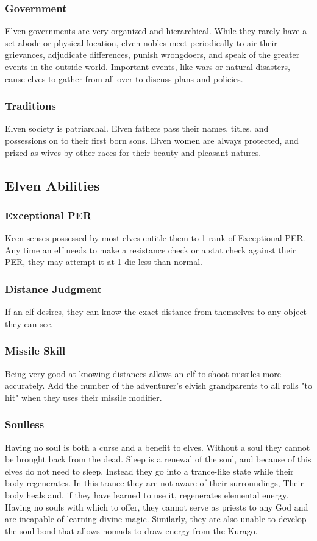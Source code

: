 \begin{multicols*}{2}
\subsubsection{Government}
Elven governments are very organized and hierarchical. While they rarely have a set abode or physical location, elven nobles meet periodically to air their grievances, adjudicate differences, punish wrongdoers, and speak of the greater events in the outside world. Important events, like wars or natural disasters, cause elves to gather from all over to discuss plans and policies.
\subsubsection{Traditions}
Elven society is patriarchal. Elven fathers pass their names, titles, and possessions on to their first born sons. Elven women are always protected, and prized as wives by other races for their beauty and pleasant natures.
\subsection{Elven Abilities}
\subsubsection{Exceptional PER}
Keen senses possessed by most elves entitle them to 1 rank of Exceptional PER. Any time an elf needs to make a resistance check or a stat check against their PER, they may attempt it at 1 die less than normal.
\subsubsection{Distance Judgment}
If an elf desires, they can know the exact distance from themselves to any object they can see.
\subsubsection{Missile Skill}
Being very good at knowing distances allows an elf to shoot missiles more accurately. Add the number of the adventurer's elvish grandparents to all rolls "to hit" when they uses their missile modifier.
\subsubsection{Soulless}
Having no soul is both a curse and a benefit to elves. Without a soul they cannot be brought back from the dead. Sleep is a renewal of the soul, and because of this elves
do not need to sleep. Instead they go into a trance-like state while their body regenerates. In this trance they are not aware of their surroundings, Their body heals and, if they have learned to use it, regenerates elemental energy. Having no souls with which to offer, they cannot serve as priests to any God and are incapable of learning divine magic. Similarly, they are also unable to develop the soul-bond that allows nomads to draw energy from the Kurago.


\end{multicols*}
